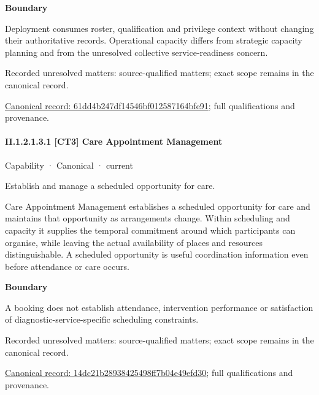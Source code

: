 \textbf{Boundary}



Deployment consumes roster, qualification and privilege context without changing their authoritative records. Operational capacity differs from strategic capacity planning and from the unresolved collective service-readiness concern.


{\small Recorded unresolved matters: source-qualified matters; exact scope remains in the canonical record.}\par
{\footnotesize \href{../../../../continuum/strategy/capability/61dd4b247df14546bf012587164bfe91.md}{Canonical record: 61dd4b247df14546bf012587164bfe91}; full qualifications and provenance.}\par
\paragraph*{II.1.2.1.3.1 [CT3] Care Appointment Management}
\label{navigation:II.1.2.1.3.1}

\label{element:14dc21b28938425498ff7b04e49efd30}
{\small Capability · Canonical · current}\par

Establish and manage a scheduled opportunity for care.



Care Appointment Management establishes a scheduled opportunity for care and maintains that opportunity as arrangements change. Within scheduling and capacity it supplies the temporal commitment around which participants can organise, while leaving the actual availability of places and resources distinguishable. A scheduled opportunity is useful coordination information even before attendance or care occurs.



\textbf{Boundary}



A booking does not establish attendance, intervention performance or satisfaction of diagnostic-service-specific scheduling constraints.


{\small Recorded unresolved matters: source-qualified matters; exact scope remains in the canonical record.}\par
{\footnotesize \href{../../../../continuum/strategy/capability/14dc21b28938425498ff7b04e49efd30.md}{Canonical record: 14dc21b28938425498ff7b04e49efd30}; full qualifications and provenance.}\par
